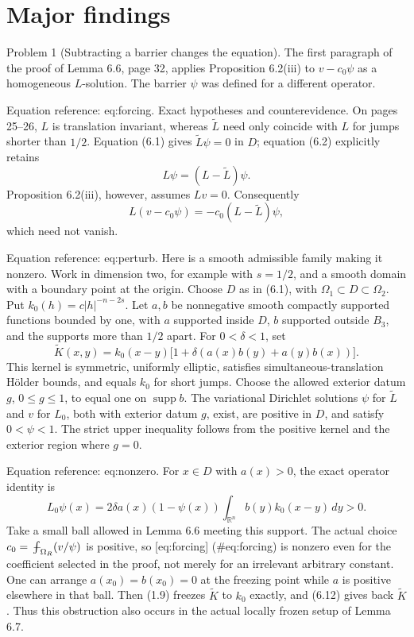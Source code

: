 \documentclass[10pt]{article}
\begin{document}
\section*{Major findings}
Problem 1 (Subtracting a barrier changes the equation).  The first paragraph of the proof of Lemma 6.6, page 32, applies Proposition 6.2(iii) to \(v-c_0\psi\) as a homogeneous \(L\)-solution. The barrier \(\psi\) was defined for a different operator.\par
Equation reference: eq:forcing. Exact hypotheses and counterevidence. On pages 25–26, \(L\) is translation invariant, whereas \(\widetilde L\) need only coincide with \(L\) for jumps shorter than \(1/2\). Equation (6.1) gives \(\widetilde L\psi=0\) in \(D\); equation (6.2) explicitly retains \[L\psi=(L-\widetilde L)\psi .\] Proposition 6.2(iii), however, assumes \(Lv=0\). Consequently \[
 L(v-c_0\psi)=-c_0(L-\widetilde L)\psi ,\] which need not vanish.\par
Equation reference: eq:perturb. Here is a smooth admissible family making it nonzero. Work in dimension two, for example with \(s=1/2\), and a smooth domain with a boundary point at the origin. Choose \(D\) as in (6.1), with \(\Omega_1\subset D\subset\Omega_2\). Put \(k_0(h)=c|h|^{-n-2s}\). Let \(a,b\) be nonnegative smooth compactly supported functions bounded by one, with \(a\) supported inside \(D\), \(b\) supported outside \(B_3\), and the supports more than \(1/2\) apart. For \(0<\delta<1\), set \[
 \widetilde K(x,y)=k_0(x-y)
 \bigl[1+\delta(a(x)b(y)+a(y)b(x))\bigr].\] This kernel is symmetric, uniformly elliptic, satisfies simultaneous-translation Hölder bounds, and equals \(k_0\) for short jumps. Choose the allowed exterior datum \(g\), \(0\le g\le1\), to equal one on \(\operatorname{supp}b\). The variational Dirichlet solutions \(\psi\) for \(\widetilde L\) and \(v\) for \(L_0\), both with exterior datum \(g\), exist, are positive in \(D\), and satisfy \(0<\psi<1\). The strict upper inequality follows from the positive kernel and the exterior region where \(g=0\).\par
Equation reference: eq:nonzero. For \(x\in D\) with \(a(x)>0\), the exact operator identity is \[
 L_0\psi(x)=2\delta a(x)(1-\psi(x))
             \int_{\mathbb R^n}b(y)k_0(x-y)\,dy>0 .\] Take a small ball allowed in Lemma 6.6 meeting this support. The actual choice \(c_0=\mathop{\mathrlap{\mkern 3mu-}\int}\nolimits_{\Omega_R}(v/\psi)\) is positive, so [eq:forcing] (\#eq:forcing) is nonzero even for the coefficient selected in the proof, not merely for an irrelevant arbitrary constant. One can arrange \(a(x_0)=b(x_0)=0\) at the freezing point while \(a\) is positive elsewhere in that ball. Then (1.9) freezes \(\widetilde K\) to \(k_0\) exactly, and (6.12) gives back \(\widetilde K\). Thus this obstruction also occurs in the actual locally frozen setup of Lemma 6.7.\par
\end{document}
